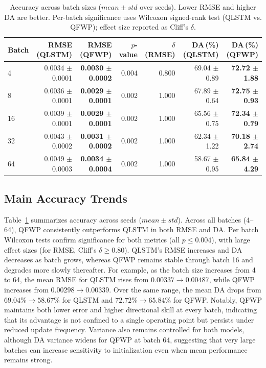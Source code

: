 \documentclass{article}
\begin{document}
\begin{table}[htbp]
  \centering
  \small
  \caption{Accuracy across batch sizes ($mean \pm std$ over seeds). Lower RMSE and higher DA are better. Per-batch significance uses Wilcoxon signed-rank test (QLSTM vs. QFWP); effect size reported as Cliff's $\delta$.}
  \label{tab:acc_main}
  \begin{tabular*}{\textwidth}{@{\extracolsep{\fill}}lrrrrrr}
    \toprule
    Batch & RMSE (QLSTM) & RMSE (QFWP) & $p$-value & $\delta$(RMSE) & DA\,(\%) (QLSTM) & DA\,(\%) (QFWP) \\
    \midrule
    4 & 0.0034 $\pm$ 0.0001 & \textbf{0.0030 $\pm$ 0.0002} & 0.004 & 0.800 & 69.04 $\pm$ 0.89 & \textbf{72.72 $\pm$ 1.88} \\
    8 & 0.0036 $\pm$ 0.0001 & \textbf{0.0029 $\pm$ 0.0001} & 0.002 & 1.000 & 67.89 $\pm$ 0.64 & \textbf{72.75 $\pm$ 0.93} \\
    16 & 0.0039 $\pm$ 0.0001 & \textbf{0.0029 $\pm$ 0.0001} & 0.002 & 1.000 & 65.56 $\pm$ 0.75 & \textbf{72.34 $\pm$ 0.79} \\
    32 & 0.0043 $\pm$ 0.0002 & \textbf{0.0031 $\pm$ 0.0002} & 0.002 & 1.000 & 62.34 $\pm$ 1.22 & \textbf{70.18 $\pm$ 2.74} \\
    64 & 0.0049 $\pm$ 0.0003 & \textbf{0.0034 $\pm$ 0.0004} & 0.002 & 1.000 & 58.67 $\pm$ 0.95 & \textbf{65.84 $\pm$ 4.29} \\
    \bottomrule
  \end{tabular*}
\end{table}



\subsection{Main Accuracy Trends}
Table~\ref{tab:acc_main} summarizes accuracy across seeds ($mean \pm std$). Across all batches (4--64), QFWP consistently outperforms QLSTM in both RMSE and DA. Per batch Wilcoxon tests confirm significance for both metrics (all $p\le 0.004$), with large effect sizes (for RMSE, Cliff's $\delta\ge 0.80$). QLSTM's RMSE increases and DA decreases as batch grows, whereas QFWP remains stable through batch 16 and degrades more slowly thereafter. For example, as the batch size increases from 4 to 64, the mean RMSE for QLSTM rises from $0.00337 \to 0.00487$, while QFWP increases from $0.00298 \to 0.00339$. Over the same range, the mean DA drops from $69.04\% \to 58.67\%$ for QLSTM and $72.72\% \to 65.84\%$ for QFWP. Notably, QFWP maintains both lower error and higher directional skill at every batch, indicating that its advantage is not confined to a single operating point but persists under reduced update frequency. Variance also remains controlled for both models, although DA variance widens for QFWP at batch 64, suggesting that very large batches can increase sensitivity to initialization even when mean performance remains strong.
\end{document}
